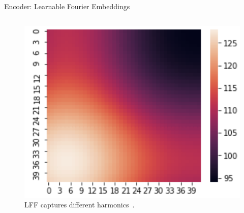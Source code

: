 \documentclass[10pt,aspectratio=169]{beamer}
\begin{document}
\begin{frame}{Encoder: Learnable Fourier Embeddings}
\begin{columns}[T]
\begin{figure}
        \includegraphics[width=\columnwidth,height=0.25\textheight,keepaspectratio]{docs/latex/figures/lff_low_freq_diag.png}
        \caption{LFF captures different harmonics~\cite{li2021llearnableFourier}.}
      \end{figure}
  \end{columns}
\end{frame}
\end{document}
